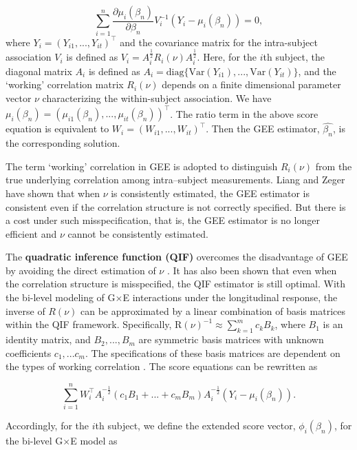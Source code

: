 \documentclass[12pt]{article}
\begin{document}
\begin{equation*}
	\sum_{i=1}^{n}\frac{\partial \mu_i (\beta_n)}{\partial \beta_n}V_i^{-1}(Y_i-\mu_i (\beta_n))=0,
\end{equation*}
where $Y_i=(Y_{i1},...,Y_{it})^\top$ and the covariance matrix for the  intra-subject association $V_i$ is defined as $V_i=A_{i}^{\frac{1}{2}}R_i(\nu)A_{i}^{\frac{1}{2}}$. Here, for the $i$th subject, the diagonal matrix $A_{i}$ is defined as $A_{i}=\text{diag}\{\text{Var}(Y_{i1}),...,\text{Var}(Y_{it})\}$, and the `working' correlation matrix $R_i(\nu)$ depends on a finite dimensional parameter vector $\nu$ characterizing the within-subject association. We have $\mu_{i} (\beta_n)=(\mu_{i1}(\beta_n),...,\mu_{it}(\beta_n))^\top$. The ratio term in the above score equation is equivalent to  $W_{i}=(W_{i1},...,W_{it})^\top$. Then the GEE estimator, $\hat{\beta_n}$, is the corresponding solution.   

The term `working' correlation in GEE is adopted to distinguish $R_i(\nu)$ from the true underlying correlation among intra--subject measurements. Liang and Zeger \cite{LZ} have shown that when $\nu$ is consistently estimated, the GEE estimator is consistent even if the correlation structure is not correctly specified. But there is a cost under such misspecification, that is, the GEE estimator is no longer efficient and $\nu$ cannot be consistently estimated.         
  

The \textbf{quadratic inference function (QIF)} overcomes the disadvantage of GEE by avoiding the direct estimation of $\nu$ \cite{QLL}. It has also been shown that even when the correlation structure is misspecified, the QIF estimator is still optimal. With the bi-level modeling of G$\times$E interactions under the longitudinal response, the  inverse of $R(\nu)$ can be approximated by a linear combination of basis matrices within the QIF framework. Specifically,  $\text{R}(\nu)^{-1} \approx \sum_{k=1}^{m}c_kB_k$, 
where $B_1$ is an identity matrix, and $B_2, ..., B_m$ are  symmetric basis matrices with unknown coefficients $c_1, ... c_m$. The specifications of these basis matrices are dependent on the types of working correlation \cite{QLL}. The score equations can be rewritten as 

\begin{equation}\label{equr:qifscore}
	\sum_{i=1}^{n}W_{i}^{\top}A_{i}^{-\frac{1}{2}}(c_1B_1+...+c_mB_m)A_{i}^{-\frac{1}{2}}(Y_i-\mu_i (\beta_n)).
\end{equation}


Accordingly, for the $i$th subject, we define the extended score vector, $\phi_i(\beta_n)$, for the bi-level G$\times$E model as
\end{document}

